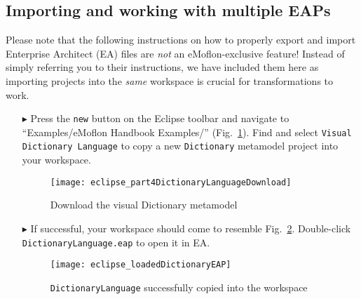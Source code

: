 \newpage
\hypertarget{multiEAP}{}
\subsection{Importing and working with multiple EAPs}
\visHeader

Please note that the following instructions on how to properly export and import Enterprise Architect (EA) files are \emph{not} an eMoflon-exclusive feature!
Instead of simply referring you to their instructions, we have included them here as importing projects into the \emph{same} workspace is crucial for
transformations to work.

\begin{itemize}

\item[$\blacktriangleright$] Press the \texttt{new} button on the Eclipse toolbar and navigate to ``Examples/eMoflon Handbook Examples/''
(Fig.~\ref{eclipse:dictionaryDownloadWizard}). Find and select \texttt{Visual Dictionary Language} to copy a new \texttt{Dictionary} metamodel project into your
workspace.

\vspace{0.5cm}

\begin{figure}[htbp]
\begin{center}
  \texttt{[image: eclipse\_part4DictionaryLanguageDownload]}
  \caption{Download the visual Dictionary metamodel}
  \label{eclipse:dictionaryDownloadWizard}
\end{center}
\end{figure}

\item[$\blacktriangleright$] If successful, your workspace should come to resemble Fig.~\ref{eclipse:loadedDictionaryEAP}. Double-click
\texttt{DictionaryLanguage.eap} to open it in EA.

\newpage

\begin{figure}[htbp]
\begin{center}
  \texttt{[image: eclipse\_loadedDictionaryEAP]}
  \caption{\texttt{DictionaryLanguage} successfully copied into the workspace}
  \label{eclipse:loadedDictionaryEAP}
\end{center}
\end{figure}

\vspace{0.5cm}


\end{itemize}
